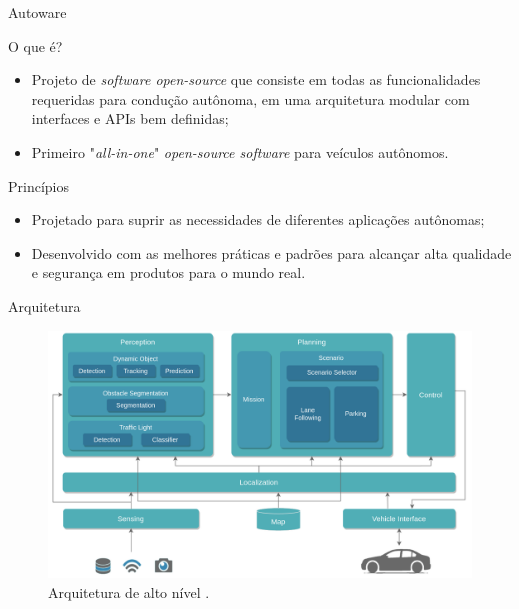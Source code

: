 \documentclass{if-beamer}
\begin{document}
\begin{frame}{Autoware}
	
	\begin{block}{O que é?}
		\begin{itemize}
			\item Projeto de \textit{software open-source} que consiste em todas as funcionalidades requeridas para condução autônoma, em uma arquitetura modular com interfaces e APIs bem definidas;
			\item Primeiro "\textit{all-in-one}" \textit{open-source software} para veículos autônomos.
		\end{itemize}
	\end{block}
	
	\begin{block}{Princípios}
		\begin{itemize}
			\item Projetado para suprir as necessidades de diferentes aplicações autônomas;
			\item Desenvolvido com as melhores práticas e padrões para alcançar alta qualidade e segurança em produtos para o mundo real.
		\end{itemize}
	\end{block}
	
	
\end{frame}

\begin{frame}{Arquitetura}
	
	\begin{figure}
		\centering
		\includegraphics[width=0.8\linewidth]{img/HL_architecture}
		\caption{Arquitetura de alto nível \cite{autowareArchitecture}.}
		\label{fig:hlarchitecture}
	\end{figure}
	
\end{frame}
\end{document}
